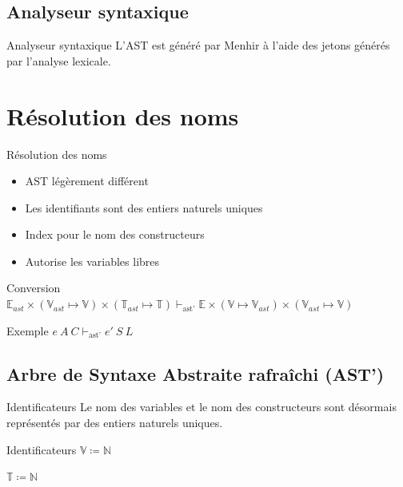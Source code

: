 \documentclass{beamer}
\begin{document}
\subsection{Analyseur syntaxique}

\begin{frame}{Analyseur syntaxique}
    L'AST est généré par Menhir à l'aide des jetons générés par l'analyse lexicale.
\end{frame}

\fi

\section{Résolution des noms}

\begin{frame}{Résolution des noms}
    \begin{itemize}
        \item AST légèrement différent
        \item Les identifiants sont des entiers naturels uniques
        \item Index pour le nom des constructeurs
        \item Autorise les variables libres
    \end{itemize}
    \begin{block}{Conversion}
        $\mathbb{E}_{ast} \times \left( \mathbb{V}_{ast} \mapsto \mathbb{V} \right) \times \left( \mathbb{T}_{ast} \mapsto \mathbb{T} \right) \vdash_{\text{ast'}} \mathbb{E} \times \left( \mathbb{V} \mapsto \mathbb{V}_{ast} \right) \times \left( \mathbb{V}_{ast} \mapsto \mathbb{V} \right)$
    \end{block}
    \begin{exampleblock}{Exemple}
        $e ~ A ~ C \vdash_{\text{ast'}} e' ~ S ~ L$
    \end{exampleblock}
\end{frame}

\iffalse
\subsection{Arbre de Syntaxe Abstraite rafraîchi (AST')}

\begin{frame}{Identificateurs}
    Le nom des variables et le nom des constructeurs sont désormais représentés par des entiers naturels uniques.

    \begin{block}{Identificateurs}
        $\mathbb{V} \coloneqq \mathbb{N}$%

        $\mathbb{T} \coloneqq \mathbb{N}$%
    \end{block}
\end{frame}
\end{document}

